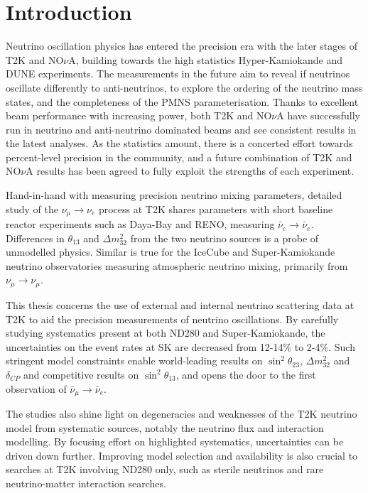 \chapter{Introduction}
\label{chap:intro}
Neutrino oscillation physics has entered the precision era with the later stages of T2K\cite{t2k_2017} and NO$\nu$A\cite{nova_2018}, building towards the high statistics Hyper-Kamiokande\cite{hyperk} and DUNE\cite{dune} experiments. The measurements in the future aim to reveal if neutrinos oscillate differently to anti-neutrinos, to explore the ordering of the neutrino mass states, and the completeness of the PMNS parameterisation\cite{p1,p2,mns}. Thanks to excellent beam performance with increasing power, both T2K and NO$\nu$A have successfully run in neutrino and anti-neutrino dominated beams and see consistent results in the latest analyses\cite{t2k_2017, nova_2018}. As the statistics amount, there is a concerted effort towards percent-level precision in the community, and a future combination of T2K and NO$\nu$A results has been agreed\cite{t2k_nova, t2k_nova_meet} to fully exploit the strengths of each experiment.

Hand-in-hand with measuring precision neutrino mixing parameters, detailed study of the $\nu_\mu \rightarrow \nu_e$ process at T2K shares parameters with short baseline reactor experiments such as Daya-Bay\cite{daya_bay} and RENO\cite{reno}, measuring $\bar{\nu}_e\rightarrow \bar{\nu}_e$. Differences in $\theta_{13}$ and $\Delta m^2_{32}$ from the two neutrino sources is a probe of unmodelled physics. Similar is true for the IceCube\cite{icecube} and Super-Kamiokande\cite{superk} neutrino observatories measuring atmospheric neutrino mixing, primarily from $\nu_\mu \rightarrow \nu_\mu$.

This thesis concerns the use of external and internal neutrino scattering data at T2K to aid the precision measurements of neutrino oscillations. By carefully studying systematics present at both ND280 and Super-Kamiokande, the uncertainties on the event rates at SK are decreased from 12-14\% to 2-4\%. Such stringent model constraints enable world-leading results on $\sin^2\theta_{23}$, $\Delta m^2_{32}$ and $\delta_{CP}$ and competitive results on $\sin^2\theta_{13}$\cite{pdg_2017}, and opens the door to the first observation of $\bar{\nu}_\mu \rightarrow \bar{\nu}_e$.

The studies also shine light on degeneracies and weaknesses of the T2K neutrino model from systematic sources, notably the neutrino flux and interaction modelling. By focusing effort on highlighted systematics, uncertainties can be driven down further. Improving model selection and availability is also crucial to searches at T2K involving ND280 only, such as sterile neutrinos and rare neutrino-matter interaction searches.


